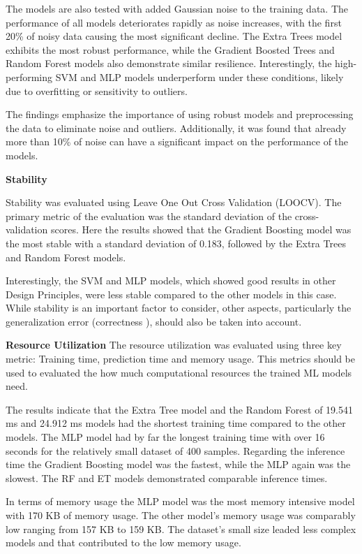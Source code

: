The models are also tested with added Gaussian noise to the training data.
The performance of all models deteriorates rapidly as noise increases, with the first 20\% of noisy data causing the
most significant decline.
The Extra Trees model exhibits the most robust performance, while the Gradient Boosted Trees and Random Forest models
also demonstrate similar resilience.
Interestingly, the high-performing SVM and MLP models underperform under these conditions, likely due to overfitting
or sensitivity to outliers.

The findings emphasize the importance of using robust models and preprocessing the data to eliminate noise and
outliers.
Additionally, it was found that already more than 10\% of noise can have a significant impact on the
performance of the models.


\textbf{Stability}

Stability was evaluated using Leave One Out Cross Validation (LOOCV).
The primary metric of the evaluation was the standard deviation of the cross-validation scores.
Here the results showed that the Gradient Boosting model was the most stable with a standard deviation of 0.183,
followed by the Extra Trees and Random Forest models.

Interestingly, the SVM and MLP models, which showed good results in other Design Principles, were less stable
compared to the other models in this case.
While stability is an important factor to consider, other aspects, particularly the generalization error (correctness
), should also be taken into account.

\textbf{Resource Utilization}
The resource utilization was evaluated using three key metric: Training time, prediction time and memory usage.
This metrics should be used to evaluated the how much computational resources the trained \ac{ML} models need.

The results indicate that the Extra Tree model and the Random Forest of 19.541 ms and 24.912 ms models had the shortest
training time compared to the other models.
The MLP model had by far the longest training time with over 16 seconds for the relatively small dataset of 400 samples.
Regarding the inference time the Gradient Boosting model was the fastest, while the MLP again was the slowest.
The RF and ET models demonstrated comparable inference times.

In terms of memory usage the MLP model was the most memory intensive model with 170 KB of memory usage.
The other model's memory usage was comparably low ranging from 157 KB to 159 KB.
The dataset's small size leaded less complex models and that contributed to the low memory usage.

